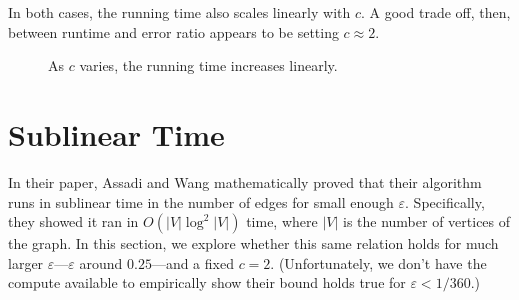 \documentclass[
]{article}
\begin{document}
In both cases, the running time also scales linearly with {\(c\)}. A good trade off, then, between runtime and error ratio appears to be
setting {\(c \approx 2\)}.
\begin{figure}[!htb]
  \caption{\label{fig:running-time-c-varies}
    As $c$ varies, the running time increases linearly.}
\end{figure}

\hypertarget{sublinear-time}{%
  \section{Sublinear Time}\label{sublinear-time}}

In their paper, Assadi and Wang mathematically proved that their algorithm
runs in sublinear time in the number of edges for small enough $\varepsilon$.
Specifically, they showed it ran in $O(|V| \log^2 |V|)$ time, where $|V|$
is the number of vertices of the graph. In this section, we explore whether
this same relation holds for much larger $\varepsilon$---$\varepsilon$ around
$0.25$---and a fixed $c = 2$. (Unfortunately, we don't have the compute available
to empirically show their bound holds true for $\varepsilon < 1 / 360$.)
\end{document}
